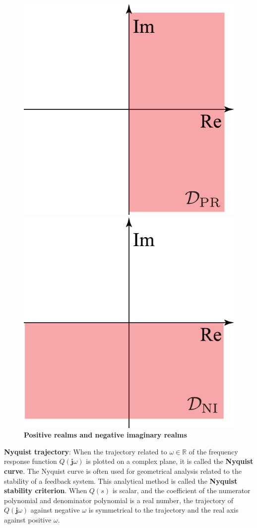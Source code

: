 \documentclass[graybox, envcountchap]{svmult}
\begin{document}
\begin{figure}[t]
  \centering
  {
  \begin{minipage}{0.49\linewidth}
    \centering
    \includegraphics[width = .65\linewidth]{figs/PRdom}
    \medskip
  \end{minipage}
  \begin{minipage}{0.49\linewidth}
    \centering
    \includegraphics[width = .65\linewidth]{figs/NIdom}
    \medskip
  \end{minipage}
  }
  \medskip
  \caption{\textbf{Positive realms and negative imaginary realms}}
  \label{fig:PRandNI}
\medskip
\end{figure}


\begin{COLUMN}
\noindent \textbf{Nyquist trajectory}:
When the trajectory related to $\omega \in \mathbb{R}$ of the frequency response function $Q(\bm{j} \omega)$ is plotted on a complex plane, it is called the \textbf{Nyquist curve}.
The Nyquist curve is often used for geometrical analysis related to the stability of a feedback system.
This analytical method is called the \textbf{Nyquist stability criterion}.
When $Q(s)$ is scalar, and the coefficient of the numerator polynomial and denominator polynomial is a real number, the trajectory of $Q(\bm{j} \omega)$ against negative $\omega$ is symmetrical to the trajectory and the real axis against positive $\omega$.
\end{COLUMN}
\end{document}
